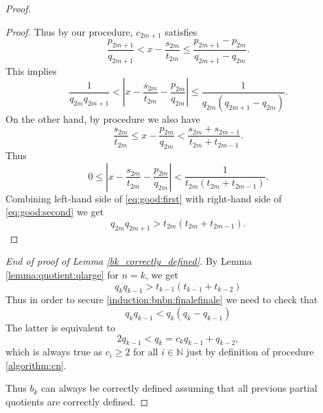 \documentclass[10pt,a4paper]{amsart}
\newcommand{\N}{\mathbb N}%
\begin{document}
\begin{proof}
\begin{proof}
Thus by our procedure, $c_{2m+1}$ satisfies
$$
\frac{p_{2m+1}}{q_{2m+1}}  < x - \frac{s_{2m}}{t_{2m}}   \leq \frac{p_{2m+1}-p_{2m}}{q_{2m+1}-q_{2m}}.
$$
This implies
\begin{equation}\label{eq:good:first}
\frac{1}{q_{2m}q_{2m+1}}  < \left| x - \frac{s_{2m}}{t_{2m}} - \frac{p_{2m}}{q_{2m}} \right| \leq \frac{1}{q_{2m}(q_{2m+1}-q_{2m})}.
\end{equation}
On the other hand, by procedure we also have
$$
\frac{s_{2m}}{t_{2m}} \leq x- \frac{p_{2m}}{q_{2m}} < \frac{s_{2m}+s_{2m-1}}{t_{2m}+t_{2m-1}}.
$$
Thus
\begin{equation}\label{eq:good:second}
0 \leq \left| x - \frac{s_{2m}}{t_{2m}} - \frac{p_{2m}}{q_{2m}} \right| < \frac{1}{t_{2m}(t_{2m}+t_{2m-1})}.
\end{equation}
Combining left-hand side of \eqref{eq:good:first} with right-hand side of \eqref{eq:good:second} we get
$$
q_{2m}q_{2m+1} > t_{2m}(t_{2m}+t_{2m-1}).
$$
\end{proof}

\noindent
\textit{End of proof of Lemma \ref{bk_correctly_defined}. }
By Lemma \ref{lemma:quotient:qlarge} for $n=k$, we get
$$
q_{k}q_{k-1} > t_{k-1} (t_{k-1}+t_{k-2})
$$
Thus in order to secure \eqref{induction:bnbn:finalefinale} we need to check that
$$
q_{k}q_{k-1} < q_k(q_k-q_{k-1})
$$
The latter is equivalent to 
$$
2 q_{k-1} < q_{k}=c_{k} q_{k-1} + q_{k-2},
$$
which is always true as $c_i\geq2$ for all $i\in\N$ just by definition of procedure \eqref{algorithm:cn}.

Thus $b_k$ can always be correctly defined assuming that all previous partial quotients are correctly defined. 
\end{proof}
\end{document}
